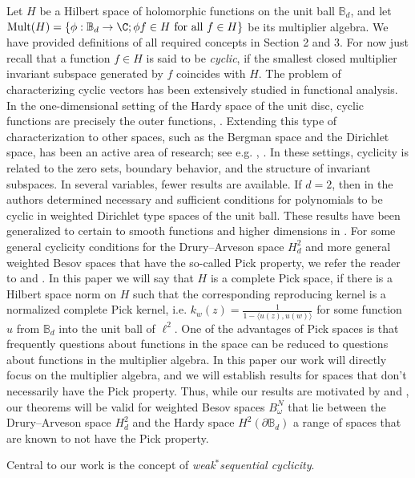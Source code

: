 \documentclass{article}
\numberwithin{equation}{section}
\newcommand{\dB}{\partial \mathbb B_d}
\newcommand{\la}{\langle}
\newcommand{\ra}{\rangle}
\newcommand{\Bd}{\mathbb B_d}
\begin{document}
Let $H$ be a Hilbert space of holomorphic functions on the unit ball $\mathbb{B}_d$, and let $\mathrm{Mult}(H)=\{\phi:\Bd \to \C; \phi f \in H \text{ for all }f\in H\}$ be its multiplier algebra. We have provided  definitions of all  required concepts in Section 2 and 3. For now just recall that a function $f \in H$ is said to be \emph{cyclic}, if the smallest closed multiplier invariant subspace generated by $f$  coincides with $H$. The problem of characterizing cyclic vectors has been extensively studied in functional analysis.  In the one-dimensional setting of the Hardy space of the unit disc, cyclic functions are precisely the outer functions,  \cite{Beurling1948}. Extending this type of characterization to other spaces, such as the Bergman space and the Dirichlet space, has been an active area of research; see e.g. \cite{HeKoZhuBook}, \cite{ElFaKeMaRaBook}. In these settings, cyclicity is related to the zero sets, boundary behavior, and the structure of invariant subspaces. In several variables, fewer results are available.  If $d=2$, then in \cite{Kosinskivavitsas2023} the authors  determined  necessary and sufficient conditions for polynomials to be cyclic in weighted Dirichlet type spaces of the unit ball. These results have been generalized to certain to smooth functions and higher dimensions in  \cite{Ziarati2025}. For some general cyclicity conditions for  the Drury--Arveson space $H^2_d$ and more general weighted Besov spaces that have the so-called Pick property, we refer the reader to \cite{AlemanPerfektRichterSundbergSunkes2023} and \cite{Richteriteratedlog}. In this paper we will say that $H$ is a complete Pick space, if there is a Hilbert space norm on $H$ such that the corresponding reproducing kernel is a normalized complete Pick kernel, i.e. $k_w(z)= \frac{1}{1-\la u(z), u(w)\ra}$ for some function $u$ from $\Bd$ into the unit ball of $\ell^2$.  One of the advantages of Pick spaces is that frequently questions about functions in the space can be reduced to questions about functions in the multiplier algebra. In this paper our work will directly focus on the multiplier algebra, and we will establish results for spaces that don't necessarily have the Pick property. Thus, while our results are motivated by \cite{AlemanPerfektRichterSundbergSunkes2023} and \cite{Richteriteratedlog},  our theorems will be valid for weighted Besov spaces $ B^N_\omega$ that lie between the Drury--Arveson space $H^2_d$ and the Hardy space $H^2(\dB)$ a range of spaces that are known to not have the Pick property.

Central to our work is the concept of \emph{weak$^\ast$sequential cyclicity}.
\end{document}
